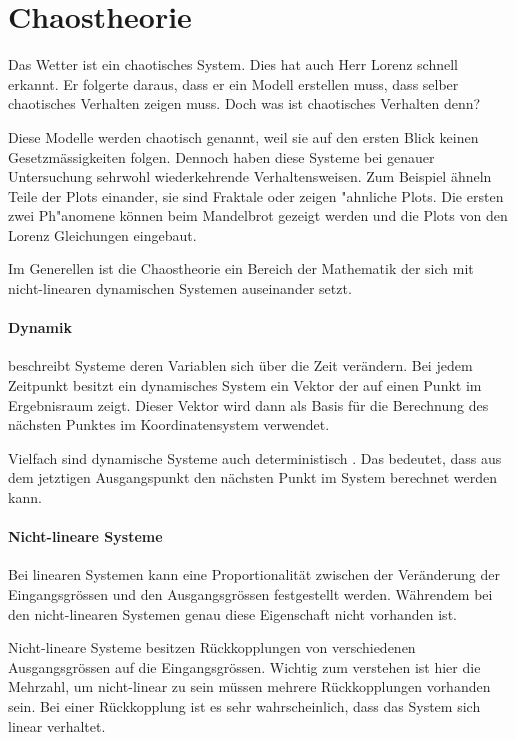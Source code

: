 
\section{Chaostheorie}
Das Wetter ist ein chaotisches System. Dies hat auch Herr Lorenz schnell erkannt. Er folgerte daraus, dass er ein Modell erstellen muss, dass selber chaotisches Verhalten zeigen muss. Doch was ist chaotisches Verhalten denn?

Diese Modelle werden chaotisch genannt, weil sie auf den ersten Blick keinen Gesetzmässigkeiten folgen. Dennoch haben diese Systeme bei genauer Untersuchung sehrwohl wiederkehrende Verhaltensweisen. Zum Beispiel ähneln Teile der Plots einander, sie sind Fraktale oder zeigen "ahnliche Plots. Die ersten zwei Ph"anomene können beim Mandelbrot gezeigt werden \cite{Gleick} und die Plots von den Lorenz Gleichungen eingebaut.

Im Generellen ist die Chaostheorie ein Bereich der Mathematik der sich mit nicht-linearen dynamischen Systemen auseinander setzt.

\paragraph{Dynamik} beschreibt Systeme deren Variablen sich über die Zeit verändern. Bei jedem Zeitpunkt besitzt ein dynamisches System ein Vektor der auf einen Punkt im Ergebnisraum zeigt. Dieser Vektor wird dann als Basis für die Berechnung des nächsten Punktes im Koordinatensystem verwendet.

Vielfach sind dynamische Systeme auch deterministisch \cite{https://en.wikipedia.org/wiki/Dynamical_system}. Das bedeutet, dass aus dem jetztigen Ausgangspunkt den nächsten Punkt im System berechnet werden kann.


\paragraph{Nicht-lineare Systeme} %
Bei linearen Systemen kann eine Proportionalität zwischen der Veränderung der Eingangsgrössen und den Ausgangsgrössen festgestellt werden. Währendem bei den nicht-linearen Systemen genau diese Eigenschaft nicht vorhanden ist.

Nicht-lineare Systeme besitzen Rückkopplungen von verschiedenen Ausgangsgrössen auf die Eingangsgrössen. Wichtig zum verstehen ist hier die Mehrzahl, um nicht-linear zu sein müssen mehrere Rückkopplungen vorhanden sein. Bei einer Rückkopplung ist es sehr wahrscheinlich, dass das System sich linear verhaltet.

